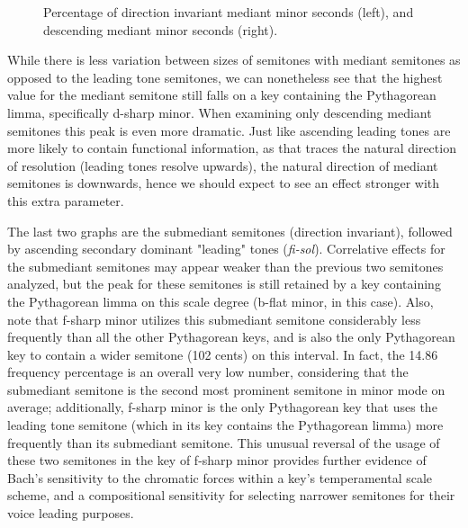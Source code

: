\begin{figure}[H]
\vspace{1.5em}
    \centering
    \caption[Percentage of direction invariant mediant minor seconds, and descending mediant minor seconds. ]{Percentage of direction invariant mediant minor seconds (left), and descending mediant minor seconds (right).}
\end{figure}    While there is less variation between sizes of semitones with mediant
semitones as opposed to the leading tone semitones, we can nonetheless
see that the highest value for the mediant semitone still falls on a key
containing the Pythagorean limma, specifically d-sharp minor. When
examining only descending mediant semitones this peak is even more
dramatic. Just like ascending leading tones are more likely to contain
functional information, as that traces the natural direction of
resolution (leading tones resolve upwards), the natural direction of
mediant semitones is downwards, hence we should expect to see an effect
stronger with this extra parameter.

The last two graphs are the submediant semitones (direction invariant),
followed by ascending secondary dominant "leading" tones
(\emph{fi-sol}). Correlative effects for the submediant semitones may
appear weaker than the previous two semitones analyzed, but the peak for
these semitones is still retained by a key containing the Pythagorean
limma on this scale degree (b-flat minor, in this case). Also, note that
f-sharp minor utilizes this submediant semitone considerably less
frequently than all the other Pythagorean keys, and is also the only
Pythagorean key to contain a wider semitone (102 cents) on this
interval. In fact, the 14.86 frequency percentage is an overall very low
number, considering that the submediant semitone is the second most
prominent semitone in minor mode on average; additionally, f-sharp minor
is the only Pythagorean key that uses the leading tone semitone (which
in its key contains the Pythagorean limma) more frequently than its
submediant semitone. This unusual reversal of the usage of these two
semitones in the key of f-sharp minor provides further evidence of
Bach's sensitivity to the chromatic forces within a key's temperamental
scale scheme, and a compositional sensitivity for selecting narrower
semitones for their voice leading purposes.

